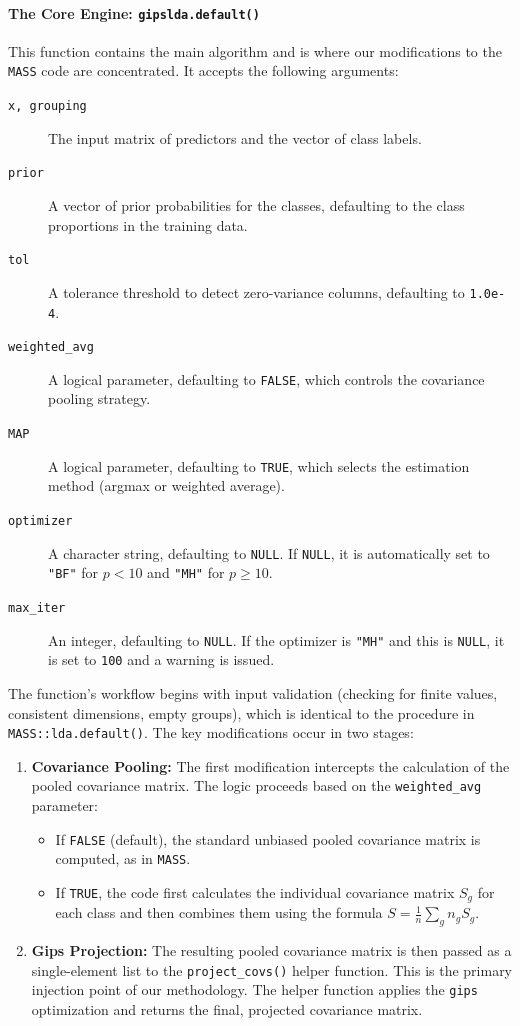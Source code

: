 \documentclass[a4paper,11pt,twoside]{report}
\theoremstyle{definition}
\begin{document}
\paragraph{The Core Engine: \texttt{gipslda.default()}}
This function contains the main algorithm and is where our modifications to the \texttt{MASS} code are concentrated. It accepts the following arguments:
\begin{description}
    \item[\texttt{x, grouping}] The input matrix of predictors and the vector of class labels.
    \item[\texttt{prior}] A vector of prior probabilities for the classes, defaulting to the class proportions in the training data.
    \item[\texttt{tol}] A tolerance threshold to detect zero-variance columns, defaulting to \texttt{1.0e-4}.
    \item[\texttt{weighted\_avg}] A logical parameter, defaulting to \texttt{FALSE}, which controls the covariance pooling strategy.
    \item[\texttt{MAP}] A logical parameter, defaulting to \texttt{TRUE}, which selects the estimation method (argmax or weighted average).
    \item[\texttt{optimizer}] A character string, defaulting to \texttt{NULL}. If \texttt{NULL}, it is automatically set to \texttt{"BF"} for $p < 10$ and \texttt{"MH"} for $p \ge 10$.
    \item[\texttt{max\_iter}] An integer, defaulting to \texttt{NULL}. If the optimizer is \texttt{"MH"} and this is \texttt{NULL}, it is set to \texttt{100} and a warning is issued.
\end{description}
The function's workflow begins with input validation (checking for finite values, consistent dimensions, empty groups), which is identical to the procedure in \texttt{MASS::lda.default()}. The key modifications occur in two stages:
\begin{enumerate}
    \item \textbf{Covariance Pooling:} The first modification intercepts the calculation of the pooled covariance matrix. The logic proceeds based on the \texttt{weighted\_avg} parameter:
    \begin{itemize}
        \item If \texttt{FALSE} (default), the standard unbiased pooled covariance matrix is computed, as in \texttt{MASS}.
        \item If \texttt{TRUE}, the code first calculates the individual covariance matrix $S_g$ for each class and then combines them using the formula $S = \frac{1}{n}\sum_{g} n_g S_{g}$.
    \end{itemize}
    \item \textbf{Gips Projection:} The resulting pooled covariance matrix is then passed as a single-element list to the \texttt{project\_covs()} helper function. This is the primary injection point of our methodology. The helper function applies the \texttt{gips} optimization and returns the final, projected covariance matrix.
\end{enumerate}
\end{document}
